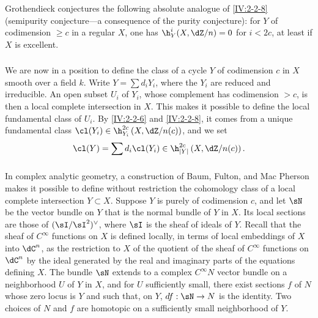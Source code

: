 \documentclass[oneside]{book}
\begin{document}
\subsubsection{}\label{IV:2-2-9}

Grothendieck conjectures the following absolute analogue of
\ref{IV:2-2-8} (semipurity conjecture---a consequence of the purity
conjecture): for $Y$ of codimension $\geqslant c$ in a regular $X$, one has
$\h_Y^i(X,\dZ/n)=0$ for $i<2 c$, at least if $X$ is excellent.






\subsubsection{}\label{IV:2-2-10}

We are now in a position to define the class of a cycle $Y$ of codimension
$c$ in $X$ smooth over a field $k$. Write $Y=\sum d_i Y_i$, where the $Y_i$
are reduced and irreducible. An open subset $U_i$ of $Y_i$, whose complement
has codimension $>c$, is then a local complete intersection in $X$. This
makes it possible to define the local fundamental class of $U_i$. By
\ref{IV:2-2-6} and \ref{IV:2-2-8}, it comes from a unique fundamental class
$\cl(Y_i)\in \h_{Y_i}^{2 c}\left(X,\dZ/n(c)\right)$, and we set
\[
  \cl(Y) = \sum d_i \cl(Y_i) \in \h_{|Y|}^{2 c}\left(X,\dZ/n(c)\right) \text{.}
\]






\subsubsection{}\label{IV:2-2-11}

In complex analytic geometry, a construction of Baum, Fulton, and
Mac Pherson \cite{bfm75} makes it possible to define without restriction the
cohomology class of a local complete intersection $Y\subset X$. Suppose $Y$
is purely of codimension $c$, and let $\sN$ be the vector bundle on $Y$ that
is the normal bundle of $Y$ in $X$. Its local sections are those of
$(\sI/\sI^2)^\vee$, where $\sI$ is the sheaf of ideals of $Y$. Recall that
the sheaf of $C^\infty$ functions on $X$ is defined locally, in terms of local
embeddings of $X$ into $\dC^n$, as the restriction to $X$ of the quotient of
the sheaf of $C^\infty$ functions on $\dC^n$ by the ideal generated by the
real and imaginary parts of the equations defining $X$. The bundle $\sN$
extends to a complex $C^\infty N$ vector bundle on a neighborhood $U$ of
$Y$ in $X$, and for $U$ sufficiently small, there exist sections $f$ of $N$
whose zero locus is $Y$ and such that, on $Y$, $d f:\sN\to N$ is the
identity. Two choices of $N$ and $f$ are homotopic on a sufficiently small
neighborhood of $Y$.
\end{document}
